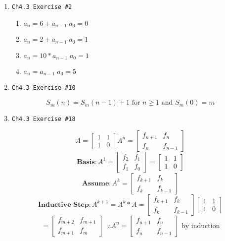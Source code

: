 \documentclass[11pt]{article}
\begin{document}
\begin{enumerate}
    \item \begin{verbatim}Ch4.3 Exercise #2\end{verbatim}
        \begin{enumerate}
            \item $a_n = 6 + a_{n-1} \; a_0 = 0$
            \item $a_n = 2 + a_{n-1} \; a_0 = 1$
            \item $a_n = 10*a_{n-1} \; a_0 = 1$
            \item $a_n = a_{n-1} \; a_0 = 5$
        \end{enumerate}
    
    \item \begin{verbatim}Ch4.3 Exercise #10\end{verbatim}
        $$S_{m}(n)=S_{m}(n-1)+1 \text{ for $n\ge 1$ and $S_m(0) = m$}$$
    
    \item \begin{verbatim}Ch4.3 Exercise #18\end{verbatim}
        $$ A = \begin{bmatrix}1 & 1 \\1 & 0 \end{bmatrix} A^n = \begin{bmatrix} f_{n+1} & f_n \\ f_n & f_{n-1}\end{bmatrix}$$
        $$ \textbf{Basis}:A^1 = \begin{bmatrix} f_2 & f_1 \\ f_1 & f_0 \end{bmatrix} = \begin{bmatrix} 1 & 1 \\ 1 & 0 \end{bmatrix}$$
        $$ \textbf{Assume}: A^k = \begin{bmatrix}f_{k+1} & f_k \\ f_k & f_{k-1}\end{bmatrix} $$
        $$ \textbf{Inductive Step}: A^{k+1} = A^k * A = \begin{bmatrix}f_{k+1} & f_k \\ f_k & f_{k-1}\end{bmatrix} \begin{bmatrix} 1 & 1 \\ 1 & 0 \end{bmatrix}$$
        $$ = \begin{bmatrix}f_{m+2} & f_{m+1}\\f_{m+1}&f_m\end{bmatrix} \;\; \therefore A^n = \begin{bmatrix}f_{n+1} & f_n \\ f_n & f_{n-1}\end{bmatrix}\text{ by induction}$$


\end{enumerate}
\end{document}
